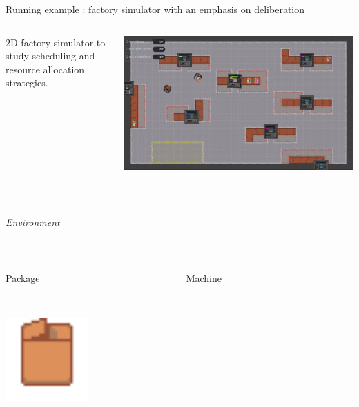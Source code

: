 \begin{frame}{Running example : factory simulator with an emphasis on deliberation}
    \begin{columns}
        \begin{column}{0.5\textwidth}
            2D factory simulator to study scheduling and resource allocation strategies.
        \end{column}
        \begin{column}{0.4\textwidth}
            \includegraphics[width=\linewidth]{images/gobot-rae.png}
        \end{column}
    \end{columns}
    
    ~~

\pause
    \centering
    \emph{Environment}

~~

\pause
    \begin{columns}
        \begin{column}{0.3\textwidth}
            \centering
            Package

            ~~

            \includegraphics[width = 0.5\textwidth]{images/godot/package.png}
        \end{column}
        \pause
        \begin{column}{0.3\textwidth}
            \centering
            Machine


\end{column}
\end{columns}
\end{frame}
